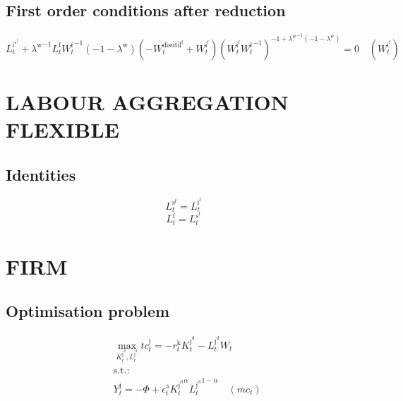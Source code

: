 \subsection{First order conditions after reduction}

\begin{equation}
L^{\mathrm{i}^{\star^{\mathrm{f}}}}_{t} + {\lambda^{\mathrm{w}}}^{-1} {L^{\mathrm{f}}_{t}} {W^{\mathrm{f}}_{t}}^{-1} \left(-1 - \lambda^{\mathrm{w}}\right) \left(-W^{\mathrm{disutil}^{\mathrm{f}}}_{t} + W^{\mathrm{i}^{\mathrm{f}}}_{t}\right) {\left({W^{\mathrm{i}^{\mathrm{f}}}_{t}} {W^{\mathrm{f}}_{t}}^{-1}\right)^{-1 + {\lambda^{\mathrm{w}}}^{-1} \left(-1 - \lambda^{\mathrm{w}}\right)}} = 0
 \quad \left(W^{\mathrm{i}^{\mathrm{f}}}_{t}\right)
\end{equation}




\section{LABOUR AGGREGATION FLEXIBLE}

\subsection{Identities}

\begin{equation}
L^{\mathrm{s}^{\mathrm{f}}}_{t} = L^{\mathrm{i}^{\mathrm{f}}}_{t}
\end{equation}
\begin{equation}
L^{\mathrm{f}}_{t} = L^{\mathrm{s}^{\mathrm{f}}}_{t}
\end{equation}




\section{FIRM}

\subsection{Optimisation problem}

\begin{align}
&\max_{K^{\mathrm{j}^{\mathrm{d}}}_{t}, L^{\mathrm{j}^{\mathrm{d}}}_{t}
} {t\!c}^{\mathrm{j}}_{t} = -{r^{\mathrm{k}}_{t}} {K^{\mathrm{j}^{\mathrm{d}}}_{t}} - {L^{\mathrm{j}^{\mathrm{d}}}_{t}} {W_{t}}\\
&\mathrm{s.t.:}\nonumber\\
& Y^{\mathrm{j}}_{t} = -\Phi + {\epsilon^{\mathrm{a}}_{t}} {{K^{\mathrm{j}^{\mathrm{d}}}_{t}}^{\alpha}} {{L^{\mathrm{j}^{\mathrm{d}}}_{t}}^{1 - \alpha}} \quad \left({m\!c}_{t}\right)
\end{align}


